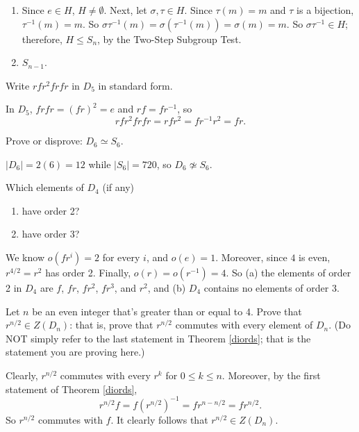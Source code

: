 \begin{solution}[print=false]
\begin{enumerate}
\item Since $e\in H$, $H\neq \emptyset$.  Next, let $\sigma, \tau\in H$.  Since $\tau(m)=m$ and $\tau$ is a bijection, $\tau^{-1}(m)=m$.  So $\sigma \tau^{-1}(m)=\sigma(\tau^{-1}(m))=\sigma(m)=m$.  So $\sigma \tau^{-1}\in H$; therefore, $H\leq S_n$, by the Two-Step Subgroup Test.
\item $S_{n-1}$.
\end{enumerate}
\end{solution}

\begin{exercise}
Write $rfr^2frfr$ in $D_5$ in standard form.
\end{exercise}

\begin{solution}[print=false]
In $D_5$, $frfr=(fr)^2=e$ and $rf=fr^{-1}$, so $$rfr^2frfr=rfr^2=fr^{-1}r^2=fr.$$
\end{solution}


\begin{exercise}
Prove or disprove: $D_6\simeq S_6$.
\end{exercise}

\begin{solution}[print=false]
$|D_6|=2(6)=12$ while $|S_6|=720$, so $D_6\not\simeq S_6$.
\end{solution}

\begin{exercise}
Which elements of $D_4$ (if any)
\begin{enumerate}
\item have order 2?
\item have order $3$?
    \end{enumerate}
\end{exercise}

\begin{solution}[print=false]
We know $o(fr^i)=2$ for every $i$, and $o(e)=1$.  Moreover, since $4$ is even, $r^{4/2}=r^2$ has order 2. Finally, $o(r)=o(r^{-1})=4$. So (a) the elements of order 2 in $D_4$ are $f$, $fr$, $fr^2$, $fr^3$, and $r^2$, and (b) $D_4$ contains no elements of order 3.
\end{solution}

\begin{exercise} Let $n$ be an even integer that's greater than or equal to 4. Prove that $r^{n/2}\in Z(D_n)$: that is, prove that $r^{n/2}$ commutes with every element of $D_n$. (Do NOT simply refer to the last statement in Theorem \ref{diords}; that is the statement you are proving here.)
\end{exercise}

\begin{solution}[print=false]
Clearly, $r^{n/2}$ commutes with every $r^k$ for $0\leq k\leq n$.  Moreover, by the first statement of Theorem \ref{diords}, $$r^{n/2}f=f(r^{n/2})^{-1}=fr^{n-n/2}=fr^{n/2}.$$  So $r^{n/2}$ commutes with $f$.  It clearly follows that $r^{n/2}\in Z(D_n)$.
\end{solution}

